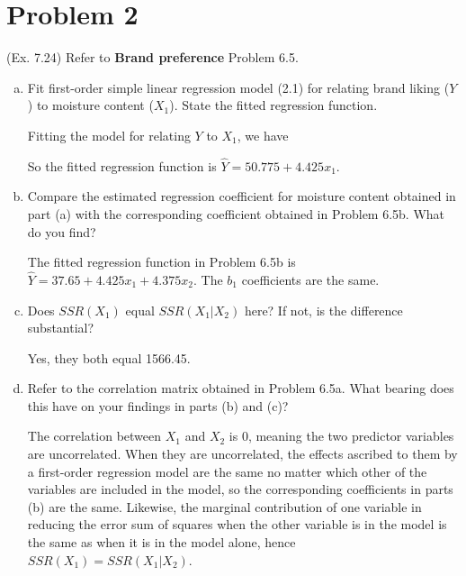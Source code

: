 \documentclass[10pt]{report}
\begin{document}
\section*{Problem 2}
(Ex. 7.24) Refer to \textbf{Brand preference}  Problem 6.5.
\begin{enumerate}[a.]
	\item 
	Fit first-order simple linear regression model (2.1) for relating brand liking ($Y$) to moisture content ($X_1$). State the fitted regression function.
	
	Fitting the model for relating $Y$ to $X_1$, we have
	
	So the fitted regression function is $\hat{Y} = 50.775 + 4.425 x_1$.
	
	\item 
	Compare the estimated regression coefficient for moisture content obtained in part (a) with the corresponding coefficient obtained in Problem 6.5b. What do you find?
	
	The fitted regression function in Problem 6.5b is $\hat{Y} = 37.65 + 4.425 x_1 + 4.375 x_2$. The $b_1$ coefficients are the same.
	
	\item 
	Does $SSR(X_1)$ equal $SSR(X_1|X_2)$ here? If not, is the difference substantial?
	
	Yes, they both equal 1566.45.
	
	\item 
	Refer to the correlation matrix obtained in Problem 6.5a. What bearing does this have on your findings in parts (b) and (c)?
	
	The correlation between $X_1$ and $X_2$ is 0, meaning the two predictor variables are uncorrelated. When they are uncorrelated, the effects ascribed to them by a first-order regression model are the same no matter which other of the variables are included in the model, so the corresponding coefficients in parts (b) are the same. Likewise, the marginal contribution of one variable in reducing the error sum of squares when the other variable is in the model is the same as when it is in the model alone, hence $SSR(X_1) = SSR(X_1|X_2)$.
	
\end{enumerate}
\end{document}
